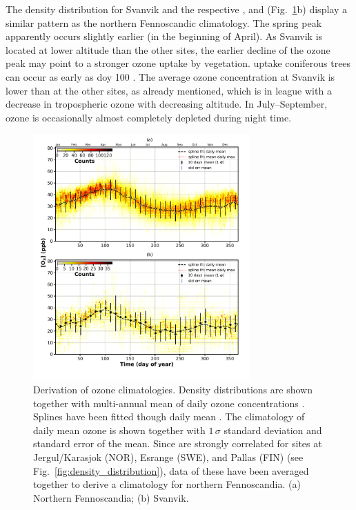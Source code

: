 \documentclass[bg, manuscript]{copernicus}
\begin{document}
The density distribution for Svanvik and the respective , and  (Fig.~\ref{fig:ozone_climatology_fenoscandic_obs_spline}b) display a similar pattern as the northern Fennoscandic climatology. The spring peak apparently occurs slightly earlier (in the beginning of April). As Svanvik is located at lower altitude than the other sites, the earlier decline of the ozone peak may point to a stronger ozone uptake by vegetation.  uptake coniferous trees can occur as early as doy 100 \citep{TB:Kolari2007}. The average ozone concentration at Svanvik is lower than at the other sites, as already mentioned, which is in league with a decrease in tropospheric ozone with decreasing altitude. In July--September, ozone is occasionally almost completely depleted during night time.

\begin{figure}[t]
  \includegraphics[width=8.3cm]{fig06}
  \caption{Derivation of ozone climatologies. Density distributions are shown together with multi-annual mean of daily ozone concentrations \chem{[O_3]}. Splines have been fitted though daily mean \chem{[O_3]}. The climatology of daily mean ozone is shown together with $1\,\sigma$ standard deviation and standard error of the mean. Since \chem{[O_3]} are strongly correlated for sites at Jergul/Karasjok (NOR), Esrange (SWE), and Pallas (FIN) (see Fig.~\ref{fig:density_distribution}), data of these have been averaged together to derive a climatology for northern Fennoscandia. (a) Northern Fennoscandia; (b) Svanvik.}
  \label{fig:ozone_climatology_fenoscandic_obs_spline}
\end{figure}
\end{document}
